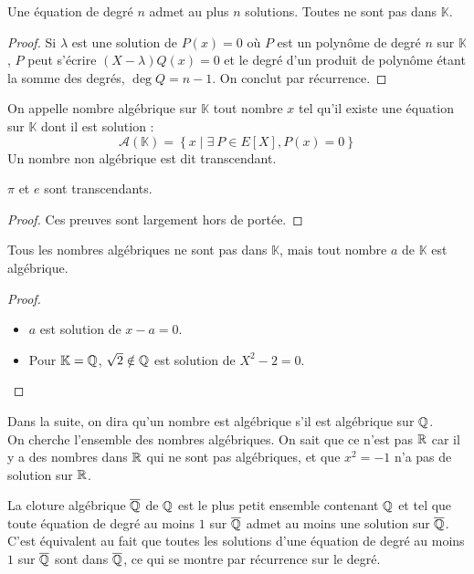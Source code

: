\documentclass{cours}
\renewcommand*{\K}{\mathbb{K}}
\begin{document}
    \begin{theorem}
        Une équation de degré $n$ admet au plus $n$ solutions. Toutes ne sont pas dans $\K$.
    \end{theorem}
    \begin{proof}
        Si $\lambda$ est une solution de $P(x) = 0$ où $P$ est un polynôme de degré $n$ sur $\K$, $P$ peut s'écrire $(X - \lambda)Q(x) = 0$ et le degré d'un produit de polynôme étant la somme des degrés, $\deg Q = n - 1$. On conclut par récurrence.
    \end{proof}

    \begin{definition}
        On appelle nombre algébrique sur $\K$ tout nombre $x$ tel qu'il existe une équation sur $\K$ dont il est solution : 
        \[
            \mathcal{A}(\K) = \left\{x \mid \exists \ P \in E[X], P(x) = 0\right\}    
        \]
        Un nombre non algébrique est dit transcendant.
    \end{definition}
    \begin{proposition}
        $\pi$ et $e$ sont transcendants.
    \end{proposition}
    \begin{proof}
        Ces preuves sont largement hors de portée. 
    \end{proof}

    \begin{proposition}
        Tous les nombres algébriques ne sont pas dans $\K$, mais tout nombre $a$ de $\K$ est algébrique.
    \end{proposition}
    \begin{proof}
        \begin{itemize}
            \item $a$ est solution de $x - a = 0$. 
            \item Pour $\K = \Q$, $\sqrt{2} \notin \mathbb{Q}$ est solution de $X^{2} - 2 = 0$. 
        \end{itemize}
    \end{proof}
    
    Dans la suite, on dira qu'un nombre est algébrique s'il est algébrique sur $\mathbb{Q}$.\\
    On cherche l'ensemble des nombres algébriques. On sait que ce n'est pas $\mathbb{R}$ car il y a des nombres dans $\mathbb{R}$ qui ne sont pas algébriques, et que $x^{2} = -1$ n'a pas de solution sur $\mathbb{R}$.

    \begin{definition}
        La cloture algébrique $\overline{\mathbb{Q}}$ de $\mathbb{Q}$ est le plus petit ensemble contenant $\mathbb{Q}$ et tel que toute équation de degré au moins $1$ sur $\overline{\mathbb{Q}}$ admet au moins une solution sur $\overline{\mathbb{Q}}$. C'est équivalent au fait que toutes les solutions d'une équation de degré au moins $1$ sur $\overline{\mathbb{Q}}$ sont dans $\overline{\mathbb{Q}}$, ce qui se montre par récurrence sur le degré.
    \end{definition}
\end{document}
